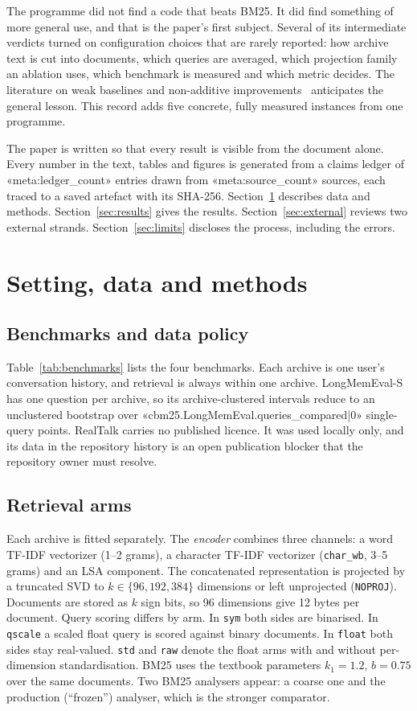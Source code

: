\documentclass[11pt,a4paper]{article}
\begin{document}
The programme did not find a code that beats BM25. It did find something of more general use, and that is the paper's first subject. Several of its intermediate verdicts turned on configuration choices that are rarely reported: how archive text is cut into documents, which queries are averaged, which projection family an ablation uses, which benchmark is measured and which metric decides. The literature on weak baselines and non-additive improvements~\citep{armstrong2009improvements,lin2019neuralhype} anticipates the general lesson. This record adds five concrete, fully measured instances from one programme.

The paper is written so that every result is visible from the document alone. Every number in the text, tables and figures is generated from a claims ledger of «meta:ledger_count» entries drawn from «meta:source_count» sources, each traced to a saved artefact with its SHA-256. Section~\ref{sec:setting} describes data and methods. Section~\ref{sec:results} gives the results. Section~\ref{sec:external} reviews two external strands. Section~\ref{sec:limits} discloses the process, including the errors.

\section{Setting, data and methods}\label{sec:setting}
\subsection{Benchmarks and data policy}
Table~\ref{tab:benchmarks} lists the four benchmarks. Each archive is one user's conversation history, and retrieval is always within one archive. LongMemEval-S has one question per archive, so its archive-clustered intervals reduce to an unclustered bootstrap over «cbm25.LongMemEval.queries_compared|0» single-query points. RealTalk carries no published licence. It was used locally only, and its data in the repository history is an open publication blocker that the repository owner must resolve.



\subsection{Retrieval arms}
Each archive is fitted separately. The \emph{encoder} combines three channels: a word TF-IDF vectorizer (1--2 grams), a character TF-IDF vectorizer (\texttt{char\_wb}, 3--5 grams) and an LSA component. The concatenated representation is projected by a truncated SVD to $k\in\{96,192,384\}$ dimensions or left unprojected (\texttt{NOPROJ}). Documents are stored as $k$ sign bits, so 96 dimensions give 12 bytes per document. Query scoring differs by arm. In \texttt{sym} both sides are binarised. In \texttt{qscale} a scaled float query is scored against binary documents. In \texttt{float} both sides stay real-valued. \texttt{std} and \texttt{raw} denote the float arms with and without per-dimension standardisation. BM25 uses the textbook parameters $k_1=1.2$, $b=0.75$ over the same documents. Two BM25 analysers appear: a coarse one and the production (``frozen'') analyser, which is the stronger comparator.
\end{document}

